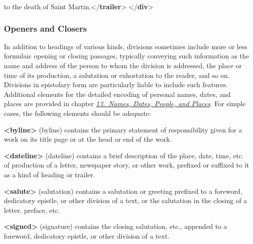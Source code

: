\begin{shaded}
\hspace*{1em}\hspace*{1em}\hspace*{1em}\hspace*{1em} to the death of Saint Martin.{</\textbf{trailer}>}\mbox{}\newline 
{}\mbox{}\newline 
{</\textbf{div}>}\end{shaded}\egroup\par 
\subsubsection[{Openers and Closers}]{Openers and Closers}\label{DSOC}\par
In addition to headings of various kinds, divisions sometimes include more or less formulaic opening or closing passages, typically conveying such information as the name and address of the person to whom the division is addressed, the place or time of its production, a salutation or exhortation to the reader, and so on. Divisions in epistolary form are particularly liable to include such features. Additional elements for the detailed encoding of personal names, dates, and places are provided in chapter \textit{\hyperref[ND]{13.\ Names, Dates, People, and Places}}. For simple cases, the following elements should be adequate: 
\begin{sansreflist}
  
\item [\textbf{<byline>}] (byline) contains the primary statement of responsibility given for a work on its title page or at the head or end of the work.
\item [\textbf{<dateline>}] (dateline) contains a brief description of the place, date, time, etc. of production of a letter, newspaper story, or other work, prefixed or suffixed to it as a kind of heading or trailer.
\item [\textbf{<salute>}] (salutation) contains a salutation or greeting prefixed to a foreword, dedicatory epistle, or other division of a text, or the salutation in the closing of a letter, preface, etc.
\item [\textbf{<signed>}] (signature) contains the closing salutation, etc., appended to a foreword, dedicatory epistle, or other division of a text.
\end{sansreflist}
\par
